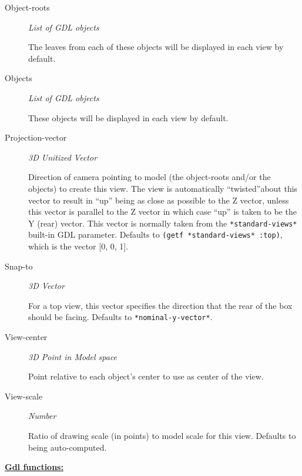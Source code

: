 \documentclass [11pt]{book}
\begin{document}
\begin{itemize}
\begin{description}
\item [Object-roots]
\emph{List of GDL objects}

 The leaves from each of these objects will be displayed in each view by default.




\item [Objects]
\emph{List of GDL objects}

 These objects will be displayed in each view by default.




\item [Projection-vector]
\emph{3D Unitized Vector}

 Direction of camera pointing to model (the object-roots and/or the objects) to create
this view. The view is automatically ``twisted''about this vector to result in ``up'' being as close as
possible to the Z vector, unless this vector is parallel to the Z vector in which case ``up'' is taken
to be the Y (rear) vector. This vector is normally taken from the \texttt{*standard-views*} built-in GDL
parameter. Defaults to \texttt{(getf *standard-views* :top)}, which is the vector [0, 0, 1].




\item [Snap-to]
\emph{3D Vector}

 For a top view, this vector specifies the direction that the rear of
the box should be facing. Defaults to \texttt{*nominal-y-vector*}.




\item [View-center]
\emph{3D Point in Model space}

 Point relative to each object's center to use as center of the view.




\item [View-scale]
\emph{Number}

 Ratio of drawing scale (in points) to model scale for this view. Defaults to being auto-computed.




\end{description}






\textbf{
\underline{Gdl functions:}}


\end{itemize}
\end{document}
